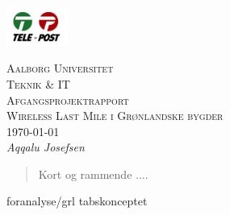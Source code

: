 \documentclass[11pt,a4paper]{report}
\begin{document}
\begin{titlepage}
 \begin{flushright}
  \includegraphics[width=0.15\textwidth]{./telelogo}~\\[1cm] %
 \end{flushright}
 \begin{center}
  \textsc{\LARGE Aalborg Universitet}\\[.5cm]
  \textsc{\Large  Teknik \& IT}\\[.5cm]
  \textsc{\large  Afgangsprojektrapport}\\[3cm]
  \textsc{\huge Wireless Last Mile i Grønlandske bygder}\\[3cm]
  \large \today\\[0.5cm]
  \emph{Aqqalu Josefsen}\\[0.6cm]
 \end{center}
\end{titlepage}

\begin{abstract}
Kort og rammende ....
\end{abstract}

{foranalyse/grl}
{tabskonceptet}

\renewcommand\appendixname{Appendix}
\begin{appendices}

\end{appendices}

\nocite{*}
\printbibliography
\end{document}
